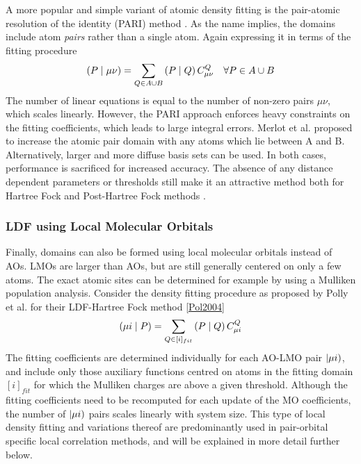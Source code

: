 A more popular and simple variant of atomic density fitting is the pair-atomic resolution of the identity (PARI) method \cite{Mer2013}. As the name implies, the domains include atom \emph{pairs} rather than a single atom. Again expressing it in terms of the fitting procedure
\begin{equation}
\left( P \mid \mu\nu \right) = \sum_{Q \in A \cup B} \left( P \mid Q \right) C^Q_{\mu\nu} \quad \forall P \in A \cup B
\end{equation}
\noindent The number of linear equations is equal to the number of non-zero pairs $\mu\nu$, which scales linearly. However, the PARI approach enforces heavy constraints on the fitting coefficients, which leads to large integral errors. Merlot et al. proposed to increase the atomic pair domain with any atoms which lie between A and B. Alternatively, larger and more diffuse basis sets can be used. In both cases, performance is sacrificed for increased accuracy. The absence of any distance dependent parameters or thresholds still make it an attractive method both for Hartree Fock and Post-Hartree Fock methods \cite{Man2015,For2020}.


\subsubsection{LDF using Local Molecular Orbitals}

Finally, domains can also be formed using local molecular orbitals instead of AOs. LMOs are larger than AOs, but are still generally centered on only a few atoms. The exact atomic sites can be determined for example by using a Mulliken population analysis. Consider the density fitting procedure as proposed by Polly et al. for their LDF-Hartree Fock method \ref{Pol2004}
\begin{equation}
\left( \mu i \mid P \right) = \sum_{Q \in [i]_{fit}} \left( P \mid Q \right) C^Q_{\mu i}
\end{equation}
The fitting coefficients are determined individually for each AO-LMO pair $\left\lvert \mu i \right)$, and include only those auxiliary functions centred on atoms in the fitting domain $[i]_{fit}$ for which the Mulliken charges are above a given threshold. Although the fitting coefficients need to be recomputed for each update of the MO coefficients, the number of $\left\lvert \mu i \right)$ pairs scales linearly with system size. This type of local density fitting and variations thereof are predominantly used in pair-orbital specific local correlation methods, and will be explained in more detail further below. 

